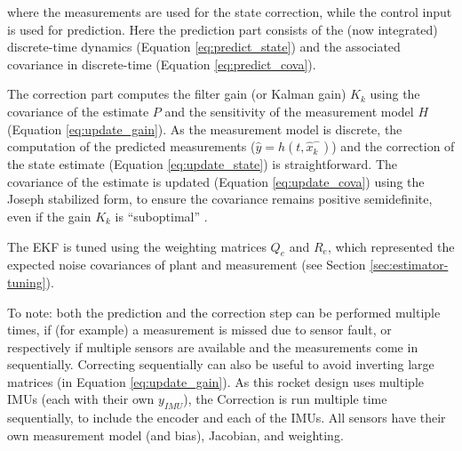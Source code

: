 where the measurements are used for the state correction, while the control input is used for prediction.
Here the prediction part consists of the (now integrated) discrete-time dynamics (Equation \ref{eq:predict_state}) and the associated covariance in discrete-time (Equation \ref{eq:predict_cova}).

The correction part computes the filter gain (or Kalman gain) $K_k$ using the covariance of the estimate $P$ and the sensitivity of the measurement model $H$ (Equation \ref{eq:update_gain}).
As the measurement model is discrete, the computation of the predicted measurements ($\hat y = h(t,\hat x_k^-)$) and the correction of the state estimate (Equation \ref{eq:update_state}) is straightforward.
The covariance of the estimate is updated  (Equation \ref{eq:update_cova}) using the Joseph stabilized form, to ensure the covariance remains positive semidefinite, even if the gain $K_k$ is ``suboptimal'' \cite{lewis2008}.

The EKF is tuned using the weighting matrices $Q_e$ and $R_e$, which represented the expected noise covariances of plant and measurement (see Section \ref{sec:estimator-tuning}).

To note: both the prediction and the correction step can be performed multiple times, if (for example) a measurement is missed due to sensor fault, or respectively if multiple sensors are available and the measurements come in sequentially.
Correcting sequentially can also be useful to avoid inverting large matrices (in Equation \ref{eq:update_gain}).
As this rocket design uses multiple IMUs (each with their own $y_{IMU}$), the Correction is run multiple time sequentially, to include the encoder and each of the IMUs.
All sensors have their own measurement model (and bias), Jacobian, and weighting.

